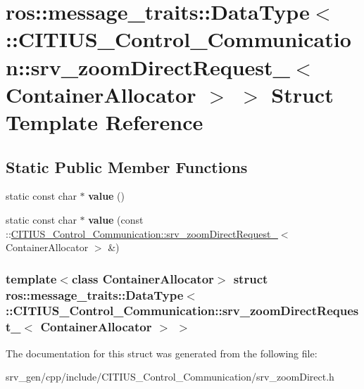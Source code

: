 \hypertarget{structros_1_1message__traits_1_1_data_type_3_01_1_1_c_i_t_i_u_s___control___communication_1_1srv1dfd039958da3ee5ac9d1d75db9aff6a}{\section{ros\-:\-:message\-\_\-traits\-:\-:\-Data\-Type$<$ \-:\-:\-C\-I\-T\-I\-U\-S\-\_\-\-Control\-\_\-\-Communication\-:\-:srv\-\_\-zoom\-Direct\-Request\-\_\-$<$ \-Container\-Allocator $>$ $>$ \-Struct \-Template \-Reference}
\label{structros_1_1message__traits_1_1_data_type_3_01_1_1_c_i_t_i_u_s___control___communication_1_1srv1dfd039958da3ee5ac9d1d75db9aff6a}
}
\subsection*{\-Static \-Public \-Member \-Functions}
\begin{DoxyCompactItemize}
\item 
\hypertarget{structros_1_1message__traits_1_1_data_type_3_01_1_1_c_i_t_i_u_s___control___communication_1_1srv1dfd039958da3ee5ac9d1d75db9aff6a_a51716dcf92ba8939ff968afe50699041}{static const char $\ast$ {\bfseries value} ()}\label{structros_1_1message__traits_1_1_data_type_3_01_1_1_c_i_t_i_u_s___control___communication_1_1srv1dfd039958da3ee5ac9d1d75db9aff6a_a51716dcf92ba8939ff968afe50699041}

\item 
\hypertarget{structros_1_1message__traits_1_1_data_type_3_01_1_1_c_i_t_i_u_s___control___communication_1_1srv1dfd039958da3ee5ac9d1d75db9aff6a_ac50aea338f53246e0e6714c56b6e8b4f}{static const char $\ast$ {\bfseries value} (const \-::\hyperlink{struct_c_i_t_i_u_s___control___communication_1_1srv__zoom_direct_request__}{\-C\-I\-T\-I\-U\-S\-\_\-\-Control\-\_\-\-Communication\-::srv\-\_\-zoom\-Direct\-Request\-\_\-}$<$ \-Container\-Allocator $>$ \&)}\label{structros_1_1message__traits_1_1_data_type_3_01_1_1_c_i_t_i_u_s___control___communication_1_1srv1dfd039958da3ee5ac9d1d75db9aff6a_ac50aea338f53246e0e6714c56b6e8b4f}

\end{DoxyCompactItemize}
\subsubsection*{template$<$class Container\-Allocator$>$ struct ros\-::message\-\_\-traits\-::\-Data\-Type$<$ \-::\-C\-I\-T\-I\-U\-S\-\_\-\-Control\-\_\-\-Communication\-::srv\-\_\-zoom\-Direct\-Request\-\_\-$<$ Container\-Allocator $>$ $>$}



\-The documentation for this struct was generated from the following file\-:\begin{DoxyCompactItemize}
\item 
srv\-\_\-gen/cpp/include/\-C\-I\-T\-I\-U\-S\-\_\-\-Control\-\_\-\-Communication/srv\-\_\-zoom\-Direct.\-h\end{DoxyCompactItemize}
